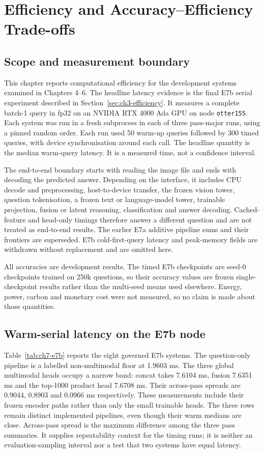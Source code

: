 \chapter{Efficiency and Accuracy–Efficiency Trade-offs}

\section{Scope and measurement boundary}
\label{sec:ch7-scope}

This chapter reports computational efficiency for the development systems
examined in Chapters 4--6. The headline latency evidence is the final E7b
serial experiment described in Section~\ref{sec:ch3-efficiency}. It measures a
complete batch-1 query in fp32 on an NVIDIA RTX 4000 Ada GPU on node
\texttt{otter155}. Each system was run in a fresh subprocess in each of three
pass-major runs, using a pinned random order. Each run used 50 warm-up queries
followed by 300 timed queries, with device synchronisation around each call.
The headline quantity is the median warm-query latency. It is a measured time,
not a confidence interval.

The end-to-end boundary starts with reading the image file and ends with
decoding the predicted answer. Depending on the interface, it includes CPU
decode and preprocessing, host-to-device transfer, the frozen vision tower,
question tokenisation, a frozen text or language-model tower, trainable
projection, fusion or latent reasoning, classification and answer decoding.
Cached-feature and head-only timings therefore answer a different question and
are not treated as end-to-end results. The earlier E7a additive pipeline sums
and their frontiers are superseded. E7b cold-first-query latency and peak-memory
fields are withdrawn without replacement and are omitted here.

All accuracies are development results. The timed E7b checkpoints are seed-0
checkpoints trained on 250k questions, so their accuracy values are frozen
single-checkpoint results rather than the multi-seed means used elsewhere.
Energy, power, carbon and monetary cost were not measured, so no claim is made
about those quantities.

\section{Warm-serial latency on the E7b node}
\label{sec:ch7-latency}

Table~\ref{tab:ch7-e7b} reports the eight governed E7b systems. The
question-only pipeline is a labelled non-multimodal floor at 1.9603 ms. The
three global multimodal heads occupy a narrow band: concat takes 7.6104 ms,
fusion 7.6351 ms and the top-1000 product head 7.6708 ms. Their across-pass
spreads are 0.9044, 0.8903 and 0.0966 ms respectively. These measurements
include their frozen encoder paths rather than only the small trainable heads.
The three rows remain distinct implemented pipelines, even though their warm
medians are close. Across-pass spread is the maximum difference among the
three pass summaries. It supplies repeatability context for the timing runs;
it is neither an evaluation-sampling interval nor a test that two systems
have equal latency.

